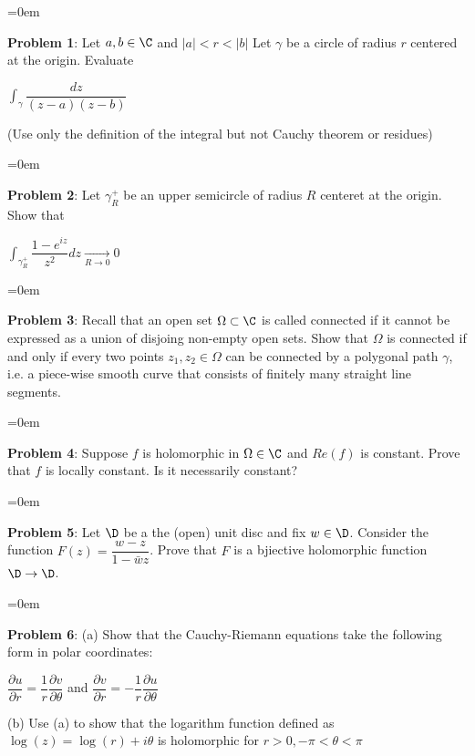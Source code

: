 \documentclass{article}
\begin{document}
\parskip=0em
\begin{mdframed}[backgroundcolor=blue!20]
\textbf{Problem 1}: Let $a, b \in \C$ and $|a| < r < |b|$ Let $\gamma$ be a circle of radius $r$ centered at the origin. Evaluate
\begin{center}
    $\int_{\gamma} \dfrac{dz}{(z-a)(z-b)}$
\end{center}
(Use only the definition of the integral but not Cauchy theorem or residues)
\end{mdframed}


\parskip=0em
\begin{mdframed}[backgroundcolor=blue!20]
\textbf{Problem 2}: Let $\gamma_R^+$ be an upper semicircle of radius $R$ centeret at the origin. Show that 
\begin{center}
    $\int_{\gamma_R^+}\dfrac{1-e^{iz}}{z^2}dz \underset{R\rightarrow 0}{\rightarrow} 0  $
\end{center}
\end{mdframed}


\parskip=0em
\begin{mdframed}[backgroundcolor=blue!20]
\textbf{Problem 3}: Recall that an open set $\Omega \subset \C$ is called connected if it cannot be expressed as a union of disjoing non-empty open sets. Show that $\Omega$ is connected if and only if every two points $z_1, z_2 \in \Omega$ can be connected by a polygonal path $\gamma$, i.e. a piece-wise smooth curve that consists of finitely many straight line segments.
\end{mdframed}


\parskip=0em
\begin{mdframed}[backgroundcolor=blue!20]
\textbf{Problem 4}: Suppose $f$ is holomorphic in $\Omega \in \C$ and $Re(f)$ is constant. Prove that $f$ is locally constant. Is it necessarily constant?
\end{mdframed}


\parskip=0em
\begin{mdframed}[backgroundcolor=blue!20]
\textbf{Problem 5}: Let $\D$ be a the (open) unit disc and fix $w \in \D$. Consider the function $F(z) = \dfrac{w-z}{1-\bar{w}z}$. Prove that $F$ is a bjiective holomorphic function $\D \to \D$. 
\end{mdframed}


\parskip=0em
\begin{mdframed}[backgroundcolor=blue!20]
\textbf{Problem 6}: (a) Show that the Cauchy-Riemann equations take the following form in polar coordinates: 
\begin{center}
    $\dfrac{\partial u}{\partial r} = \dfrac{1}{r}\dfrac{\partial v}{\partial \theta}$ and $\dfrac{\partial v}{\partial r} = -\dfrac{1}{r}\dfrac{\partial u}{\partial \theta}$
\end{center}
(b) Use (a) to show that the logarithm function defined as $\log(z) = \log(r) + i\theta$ is holomorphic for $r > 0, -\pi < \theta < \pi$
\end{mdframed}
\end{document}
